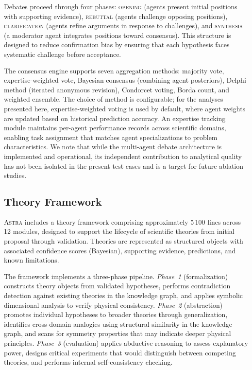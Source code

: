 \documentclass[usenatbib]{rasti}
\newcommand{\astra}{\textsc{Astra}\xspace}
\begin{document}
Debates proceed through four phases: \textsc{opening} (agents present initial positions with supporting evidence), \textsc{rebuttal} (agents challenge opposing positions), \textsc{clarification} (agents refine arguments in response to challenges), and \textsc{synthesis} (a moderator agent integrates positions toward consensus).
This structure is designed to reduce confirmation bias by ensuring that each hypothesis faces systematic challenge before acceptance.

The consensus engine supports seven aggregation methods: majority vote, expertise-weighted vote, Bayesian consensus (combining agent posteriors), Delphi method (iterated anonymous revision), Condorcet voting, Borda count, and weighted ensemble.
The choice of method is configurable; for the analyses presented here, expertise-weighted voting is used by default, where agent weights are updated based on historical prediction accuracy.
An expertise tracking module maintains per-agent performance records across scientific domains, enabling task assignment that matches agent specializations to problem characteristics.
We note that while the multi-agent debate architecture is implemented and operational, its independent contribution to analytical quality has not been isolated in the present test cases and is a target for future ablation studies.

\subsection{Theory Framework}
\label{sec:methods:theory}

\astra includes a theory framework comprising approximately 5\,100 lines across 12 modules, designed to support the lifecycle of scientific theories from initial proposal through validation.
Theories are represented as structured objects with associated confidence scores (Bayesian), supporting evidence, predictions, and known limitations.

The framework implements a three-phase pipeline.
\emph{Phase~1} (formalization) constructs theory objects from validated hypotheses, performs contradiction detection against existing theories in the knowledge graph, and applies symbolic dimensional analysis to verify physical consistency.
\emph{Phase~2} (abstraction) promotes individual hypotheses to broader theories through generalization, identifies cross-domain analogies using structural similarity in the knowledge graph, and scans for symmetry properties that may indicate deeper physical principles.
\emph{Phase~3} (evaluation) applies abductive reasoning to assess explanatory power, designs critical experiments that would distinguish between competing theories, and performs internal self-consistency checking.
\end{document}

